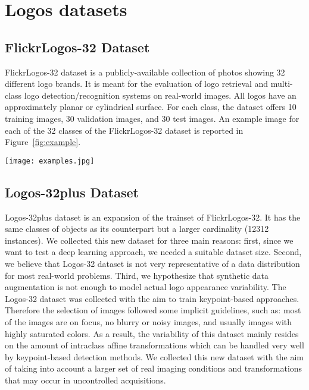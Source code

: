 \documentclass[final,5p,twocolumn]{elsarticle}
\begin{document}
\section{Logos datasets}
\subsection{FlickrLogos-32 Dataset}
\label{sec:flickr32dataset}
FlickrLogos-32 dataset \cite{romberg2011scalable} is a publicly-available collection of photos showing 32 different logo brands. It is meant for the evaluation of logo retrieval and multi-class logo detection/recognition systems on real-world images. All logos have an approximately planar or cylindrical surface.
For each class, the dataset offers 10 training images, 30 validation images, and 30 test images. An example image for each of the 32 classes of the FlickrLogos-32 dataset is reported in Figure~\ref{fig:example}.

\begin{figure*}[htbpp]
	\centering
	\texttt{[image: examples.jpg]}
	\caption{Example images for each of the 32 classes of the FlickrLogos-32 dataset.}
	\label{fig:example}
\end{figure*}

\subsection{Logos-32plus Dataset}
\label{sec:ivldataset}
Logos-32plus dataset is an expansion of the trainset of FlickrLogos-32. It has the same classes of objects as its counterpart but a larger cardinality (12312 instances).
We collected this new dataset for three main reasons: first, since we want to test a deep learning approach,
we needed a suitable dataset size. Second, we believe that Logos-32 dataset is not very representative of a data distribution for most real-world problems. Third, we hypothesize that synthetic data augmentation is not enough to model actual logo appearance variability.
The Logos-32 dataset was collected with the aim to train keypoint-based approaches. Therefore the selection of images followed some implicit guidelines, such as: most of the images are on focus, no blurry or noisy images, and usually images with highly saturated colors. As a result, the variability of this dataset mainly resides on the amount of intraclass affine transformations which can be handled very well by keypoint-based detection methods. We collected this new dataset with the aim of taking into account a larger set of real imaging conditions and transformations that may occur in uncontrolled acquisitions.
\end{document}
